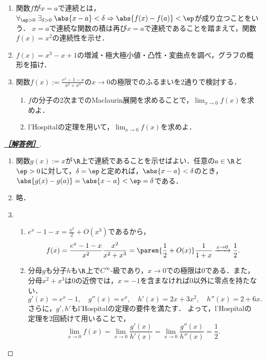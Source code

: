 \documentclass[uplatex,dvipdfmx]{jsarticle}
\begin{document}
\begin{tcolorbox}[colframe=ForestGreen, colback=ForestGreen!10!white,breakable,colbacktitle=ForestGreen!40!white,coltitle=black,fonttitle=\bfseries\sffamily,
    title=第２問]
    \begin{problem}\mbox{}
        \begin{enumerate}[{問}1]
            \item 関数$f$が$x=a$で連続とは，$\forall_{\ep>0}\;\exists_{\delta>0}\;\abs{x-a}<\delta\Rightarrow\abs{f(x)-f(a)}<\ep$が成り立つことをいう．
            $x=a$で連続な関数の積は再び$x=a$で連続であることを踏まえて，関数$f(x)=x^2$の連続性を示せ．
            \item $f(x)=x^3-x+1$の増減・極大極小値・凸性・変曲点を調べ，グラフの概形を描け．
            \item 関数$f(x):=\frac{e^x-1-x}{x^2+x^3}$の$x\to0$の極限でのふるまいを2通りで検討する．
            \begin{enumerate}
                \item $f$の分子の2次までのMaclaurin展開を求めることで，$\lim_{x\to0}f(x)$を求めよ．
                \item l'Hospitalの定理を用いて，$\lim_{x\to0}f(x)$を求めよ．
            \end{enumerate}
        \end{enumerate}
    \end{problem}
\end{tcolorbox}
\begin{proof}[\textbf{\underline{［解答例］}}]\mbox{}
    \begin{enumerate}
        \item 関数$g(x):=x$が$\R$上で連続であることを示せばよい．任意の$a\in\R$と$\ep>0$に対して，$\delta=\ep$と定めれば，$\abs{x-a}<\delta$のとき，$\abs{g(x)-g(a)}=\abs{x-a}<\ep=\delta$である．
        \item 略．
        \item 
        \begin{enumerate}
            \item $e^x-1-x=\frac{x^2}{2}+O(x^3)$であるから，
            \[f(x)=\frac{e^x-1-x}{x^2}\frac{x^2}{x^2+x^3}=\paren{\frac{1}{2}+O(x)}\frac{1}{1+x}\xrightarrow{x\to0}\frac{1}{2}.\]
            \item 分母$g$も分子$h$も$\R$上で$C^\infty$-級であり，$x\to0$での極限は$0$である．また，分母$x^2+x^3$は$0$の近傍では，$x=-1$を含まなければ$0$以外に零点を持たない．
            \[g'(x)=e^x-1,\quad g''(x)=e^x,\quad h'(x)=2x+3x^2,\quad h''(x)=2+6x.\]
            さらに，$g',h'$もl'Hospitalの定理の要件を満たす．
            よって，l'Hospitalの定理を2回続けて用いることで，
            \[\lim_{x\to0}f(x)=\lim_{x\to0}\frac{g'(x)}{h'(x)}=\lim_{x\to0}\frac{g''(x)}{h''(x)}=\frac{1}{2}.\]
        \end{enumerate}
    \end{enumerate}
\end{proof}
\end{document}

